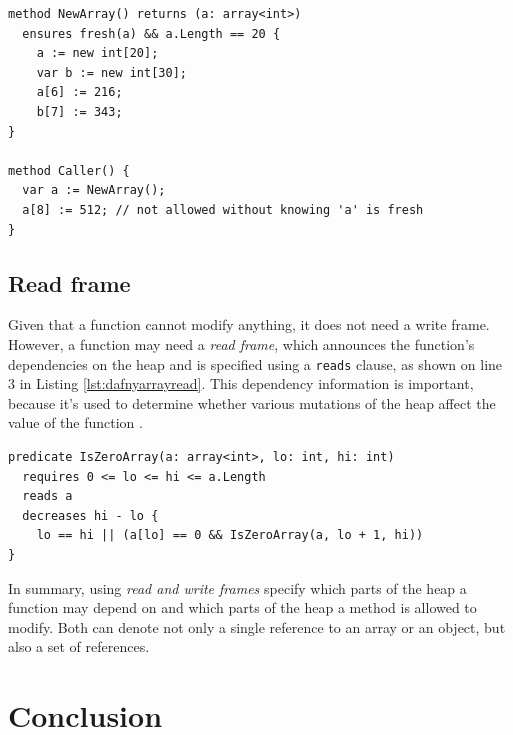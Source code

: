 \documentclass[a4paper]{article}
\begin{document}
\begin{lstlisting}[style=dafnystyle, caption={Method that guarantees a freshly allocated array.}, label={lst:dafnyarrayfresh}]
method NewArray() returns (a: array<int>)
  ensures fresh(a) && a.Length == 20 {
    a := new int[20];
    var b := new int[30];
    a[6] := 216;
    b[7] := 343;
}

method Caller() {
  var a := NewArray();
  a[8] := 512; // not allowed without knowing 'a' is fresh
}
\end{lstlisting}
\subsection{Read frame}
Given that a function cannot modify anything, it does not need a write frame. However, a function may need a
\textit{read frame}, which announces the function's dependencies on the heap and is specified using a
\texttt{reads} clause, as shown on line 3 in Listing \ref{lst:dafnyarrayread}. This dependency information is
important, because it's used to determine whether various mutations of the heap aﬀect the value of the
function \cite{leino2023program}.
\begin{lstlisting}[style=dafnystyle, caption={Function that reads an array.}, label={lst:dafnyarrayread}]
predicate IsZeroArray(a: array<int>, lo: int, hi: int)
  requires 0 <= lo <= hi <= a.Length
  reads a
  decreases hi - lo {
    lo == hi || (a[lo] == 0 && IsZeroArray(a, lo + 1, hi))
}
\end{lstlisting}
In summary, using \textit{read and write frames} specify which parts of the heap a function may depend on and which
parts of the heap a method is allowed to modify. Both can denote not only a single reference to an array or an object,
but also a set of references.

\section{Conclusion}


\newpage

\listoffigures
\lstlistoflistings


\end{document}
